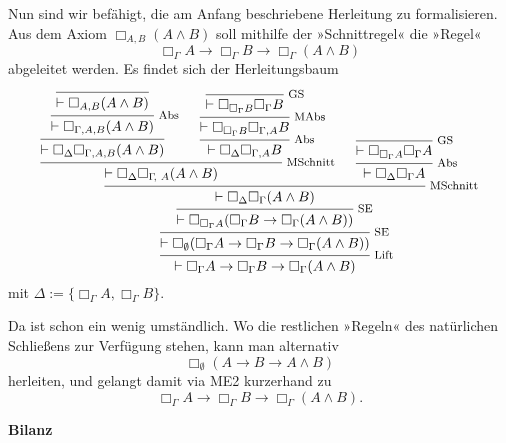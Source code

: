 \documentclass[9pt,fleqn,aspectratio=169]{beamer}
\newcommand{\strong}[1]{\textbf{#1}}
\newcommand{\headline}[1]{\begin{center}\strong{#1}\end{center}}
\newcommand{\lnec}{\Box}
\newcommand{\inote}[1]{{\!\footnotesize #1}}
\begin{document}
\begin{frame}
Nun sind wir befähigt, die am Anfang beschriebene Herleitung zu formalisieren.
Aus dem Axiom $\lnec_{A,B} (A\land B)$ soll mithilfe der »Schnittregel« die »Regel«
\[\lnec_\Gamma A\to\lnec_\Gamma B\to\lnec_\Gamma (A\land B)\]
abgeleitet werden. Es findet sich der Herleitungsbaum\pause
\[\begin{prooftree}
              \infer0{\vdash\lnec_{A,B}(A\land B)}
            \infer1[\inote{Abs}]{\vdash\lnec_{\Gamma,A,B}(A\land B)}
          \infer1{\vdash\lnec_\Delta\lnec_{\Gamma,A,B}(A\land B)}
              \infer0[\inote{GS}]{\vdash\lnec_{\lnec_\Gamma B}\lnec_\Gamma B}
            \infer1[\inote{MAbs}]{\vdash\lnec_{\lnec_\Gamma B}\lnec_{\Gamma,A} B}
          \infer1[\inote{Abs}]{\vdash\lnec_\Delta\lnec_{\Gamma,A} B}
        \infer2[\inote{MSchnitt}]{\vdash\lnec_\Delta\lnec_{\Gamma\!,\,\,A}(A\land B)}
          \infer0[\inote{GS}]{\vdash\lnec_{\lnec_\Gamma A}\lnec_\Gamma A}
        \infer1[\inote{Abs}]{\vdash\lnec_\Delta\lnec_\Gamma A}
      \infer2[\inote{MSchnitt}]{\vdash\lnec_\Delta\lnec_\Gamma (A\land B)}
    \infer1[\inote{SE}]{\vdash\lnec_{\lnec_\Gamma A}(\lnec_\Gamma B\to\lnec_\Gamma (A\land B))}
  \infer1[\inote{SE}]{\vdash\lnec_\emptyset(\lnec_\Gamma A\to\lnec_\Gamma B\to\lnec_\Gamma (A\land B))}
\infer1[\inote{Lift}]{\vdash\lnec_\Gamma A\to\lnec_\Gamma B\to\lnec_\Gamma (A\land B)}
\end{prooftree}\]
mit $\Delta:=\{\lnec_\Gamma A,\lnec_\Gamma B\}$.
\end{frame}

\begin{frame}
Da ist schon ein wenig umständlich. Wo die restlichen »Regeln« des
natürlichen Schließens zur Verfügung stehen, kann man alternativ
\[\lnec_\emptyset(A\to B\to A\land B)\]
herleiten, und gelangt damit via ME2 kurzerhand zu
\[\lnec_\Gamma A\to\lnec_\Gamma B\to\lnec_\Gamma (A\land B).\]
\end{frame}

\begin{frame}
\headline{Bilanz}
\end{frame}
\end{document}
